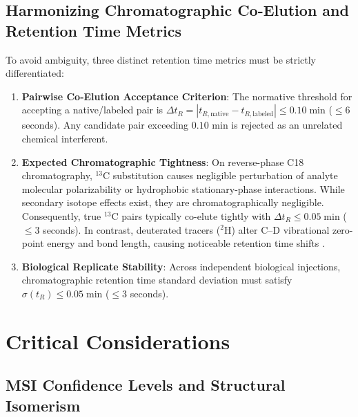 \documentclass[11pt,twoside,openright]{book}
\begin{document}
\subsection{Harmonizing Chromatographic Co-Elution and Retention Time Metrics}

To avoid ambiguity, three distinct retention time metrics must be strictly differentiated:
\begin{enumerate}
    \item \textbf{Pairwise Co-Elution Acceptance Criterion}: The normative threshold for accepting a native/labeled pair is $\Delta t_R = |t_{R, \text{native}} - t_{R, \text{labeled}}| \le 0.10\;\text{min}$ ($\le 6$ seconds). Any candidate pair exceeding $0.10$ min is rejected as an unrelated chemical interferent.
    \item \textbf{Expected Chromatographic Tightness}: On reverse-phase C18 chromatography, $^{13}\text{C}$ substitution causes negligible perturbation of analyte molecular polarizability or hydrophobic stationary-phase interactions. While secondary isotope effects exist, they are chromatographically negligible. Consequently, true $^{13}\text{C}$ pairs typically co-elute tightly with $\Delta t_R \le 0.05\;\text{min}$ ($\le 3$ seconds). In contrast, deuterated tracers ($^{2}\text{H}$) alter C--D vibrational zero-point energy and bond length, causing noticeable retention time shifts \cite{wade1999deuterium}.
    \item \textbf{Biological Replicate Stability}: Across independent biological injections, chromatographic retention time standard deviation must satisfy $\sigma(t_R) \le 0.05\;\text{min}$ ($\le 3$ seconds).
\end{enumerate}

\section{Critical Considerations}

\subsection{MSI Confidence Levels and Structural Isomerism}
\end{document}
